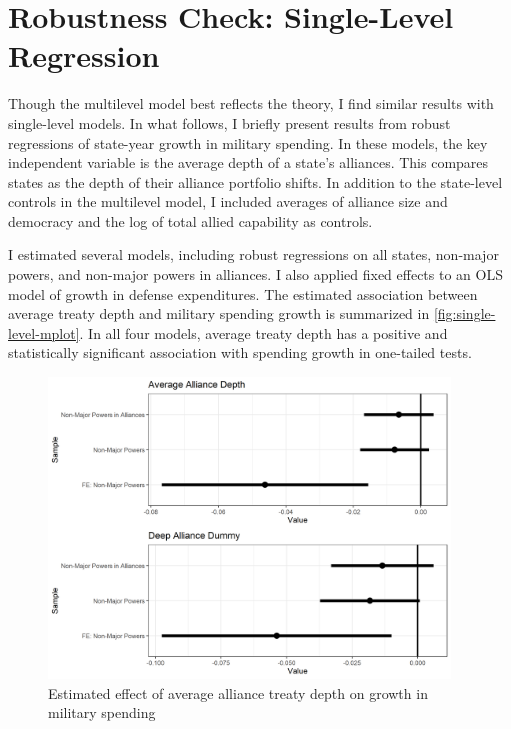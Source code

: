 \documentclass[12pt]{article}
\begin{document}
\section{Robustness Check: Single-Level Regression}

Though the multilevel model best reflects the theory, I find similar results with single-level models. 
In what follows, I briefly present results from robust regressions of state-year growth in military spending. 
In these models, the key independent variable is the average depth of a state's alliances. 
This compares states as the depth of their alliance portfolio shifts. 
In addition to the state-level controls in the multilevel model, I included averages of alliance size and democracy and the log of total allied capability as controls. 


I estimated several models, including robust regressions on all states, non-major powers, and non-major powers in alliances. 
I also applied fixed effects to an OLS model of growth in defense expenditures. 
The estimated association between average treaty depth and military spending growth is summarized in \autoref{fig:single-level-mplot}. 
In all four models, average treaty depth has a positive and statistically significant association with spending growth in one-tailed tests. 


\begin{figure}[htbp]
	\centering
		\includegraphics[width=0.95\textwidth]{single-level-mplot.png}
	\caption{Estimated effect of average alliance treaty depth on growth in military spending }
	\label{fig:single-level-mplot}
\end{figure}
\end{document}
